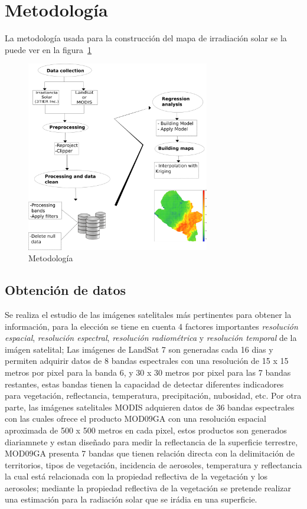 
\section{Metodología}

La metodología usada para la construcción del mapa de irradiación solar se la puede ver en la figura~\ref{fig:metodology}

\begin{figure}
  \centering
  \includegraphics[width = 8cm]{metodology.png}
  \caption{Metodología}
  \label{fig:metodology}
\end{figure}

\subsection{Obtención de datos}

Se realiza el estudio de las imágenes satelitales más pertinentes para obtener la información, para la elección se tiene 
en cuenta 4 factores importantes \textit{resolución espacial}, \textit{resolución espectral}, \textit{resolución radiométrica} 
y \textit{resolución temporal} de la imágen satelital; Las imágenes de LandSat 7 son generadas cada 16 dias y permiten adquirir
datos de 8 bandas espectrales con una resolución de 15 x 15 metros por pixel para la banda 6, y 30 x 30 metros por pixel para las 7 bandas restantes, 
estas bandas tienen la capacidad de detectar diferentes indicadores para vegetación, reflectancia, temperatura, precipitación, 
nubosidad, etc. Por otra parte, las imágenes satelitales MODIS adquieren datos de 36 bandas espectrales con las cuales ofrece 
el producto MOD09GA con una resolución espacial aproximada de 500 x 500 metros en cada pixel, estos productos son generados diariamnete 
y estan diseñado para medir la reflectancia de la superficie terrestre\cite{mod09gadetails}\cite{modisweb}, MOD09GA 
presenta 7 bandas que tienen relación directa con la delimitación de territorios, tipos de vegetación, incidencia de aerosoles, 
temperatura y reflectancia la cual está relacionada con la propiedad reflectiva de la vegetación y los aerosoles; mediante la propiedad 
reflectiva de la vegetación se pretende realizar una estimación para la radiación solar que se irádia en una superficie.

